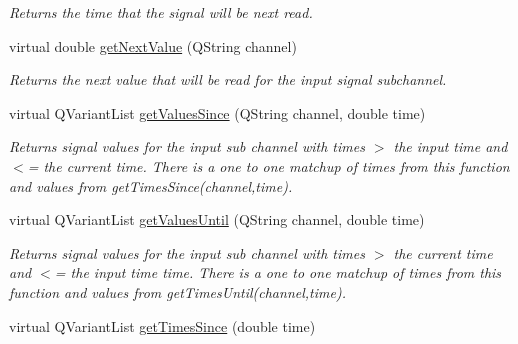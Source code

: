 \begin{DoxyCompactItemize}
\begin{DoxyCompactList}\small\item\em Returns the time that the signal will be next read. \end{DoxyCompactList}\item 
\hypertarget{class_picto_1_1_live_signal_reader_a7d91e42f69ad1f86c2776ec596e3991a}{virtual double \hyperlink{class_picto_1_1_live_signal_reader_a7d91e42f69ad1f86c2776ec596e3991a}{get\-Next\-Value} (Q\-String channel)}\label{class_picto_1_1_live_signal_reader_a7d91e42f69ad1f86c2776ec596e3991a}

\begin{DoxyCompactList}\small\item\em Returns the next value that will be read for the input signal subchannel. \end{DoxyCompactList}\item 
\hypertarget{class_picto_1_1_live_signal_reader_a5c56ed81dff62627f175a122d06cabd0}{virtual Q\-Variant\-List \hyperlink{class_picto_1_1_live_signal_reader_a5c56ed81dff62627f175a122d06cabd0}{get\-Values\-Since} (Q\-String channel, double time)}\label{class_picto_1_1_live_signal_reader_a5c56ed81dff62627f175a122d06cabd0}

\begin{DoxyCompactList}\small\item\em Returns signal values for the input sub channel with times $>$ the input time and $<$= the current time. There is a one to one matchup of times from this function and values from get\-Times\-Since(channel,time). \end{DoxyCompactList}\item 
\hypertarget{class_picto_1_1_live_signal_reader_a88a1320f1154f7f4fea727f29d93e57b}{virtual Q\-Variant\-List \hyperlink{class_picto_1_1_live_signal_reader_a88a1320f1154f7f4fea727f29d93e57b}{get\-Values\-Until} (Q\-String channel, double time)}\label{class_picto_1_1_live_signal_reader_a88a1320f1154f7f4fea727f29d93e57b}

\begin{DoxyCompactList}\small\item\em Returns signal values for the input sub channel with times $>$ the current time and $<$= the input time time. There is a one to one matchup of times from this function and values from get\-Times\-Until(channel,time). \end{DoxyCompactList}\item 
\hypertarget{class_picto_1_1_live_signal_reader_a8cb1dd61a14232153e7308b8836ff94d}{virtual Q\-Variant\-List \hyperlink{class_picto_1_1_live_signal_reader_a8cb1dd61a14232153e7308b8836ff94d}{get\-Times\-Since} (double time)}\label{class_picto_1_1_live_signal_reader_a8cb1dd61a14232153e7308b8836ff94d}


\end{DoxyCompactItemize}
